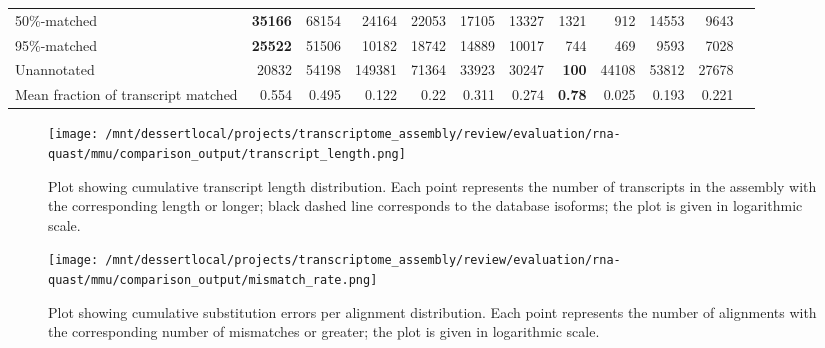 \documentclass[12pt,a4paper]{article}
\begin{document}
\begin{table}[t]
\begin{adjustbox}{width=1\textwidth}
\begin{tabular}{|l*{11}{|r}|}
50\%-matched                                            & \textbf{35166}         & 68154                  & 24164                  & 22053                  & 17105                  & 13327                  & 1321                   & 912                    & 14553                  & 9643                   \\
95\%-matched                                            & \textbf{25522}         & 51506                  & 10182                  & 18742                  & 14889                  & 10017                  & 744                    & 469                    & 9593                   & 7028                   \\
Unannotated                                             & 20832                  & 54198                  & 149381                 & 71364                  & 33923                  & 30247                  & \textbf{100}           & 44108                  & 53812                  & 27678                  \\
Mean fraction of transcript matched                     & 0.554                  & 0.495                  & 0.122                  & 0.22                   & 0.311                  & 0.274                  & \textbf{0.78}          & 0.025                  & 0.193                  & 0.221                  \\ \hline
\end{tabular}
\end{adjustbox}
\end{table}

\FloatBarrier
\clearpage
{}

\begin{figure}[t]
\centering
\texttt{[image: /mnt/dessertlocal/projects/transcriptome\_assembly/review/evaluation/rna-quast/mmu/comparison\_output/transcript\_length.png]}
\caption{Plot showing cumulative transcript length distribution. Each point represents the number of transcripts in the assembly with the corresponding length or longer; black dashed line corresponds to the database isoforms; the plot is given in logarithmic scale.}
\end{figure}
\FloatBarrier
\clearpage


\begin{figure}[t]
\centering
\texttt{[image: /mnt/dessertlocal/projects/transcriptome\_assembly/review/evaluation/rna-quast/mmu/comparison\_output/mismatch\_rate.png]}
\caption{Plot showing cumulative substitution errors per alignment distribution. Each point represents the number of alignments with the corresponding number of mismatches or greater; the plot is given in logarithmic scale.}
\end{figure}
\FloatBarrier
\clearpage
\end{document}
